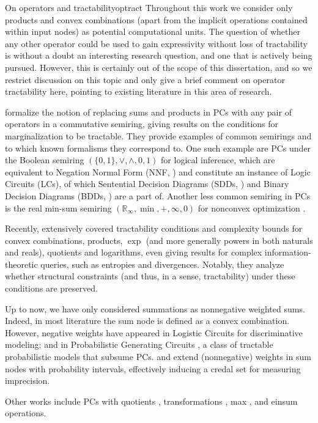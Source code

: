 \begin{remark}[breakable]{On operators and tractability}{optract}
  Throughout this work we consider only products and convex combinations (apart from the implicit
  operations contained within input nodes) as potential computational units. The question of whether
  any other operator could be used to gain expressivity without loss of tractability is without a
  doubt an interesting research question, and one that is actively being pursued. However, this is
  certainly out of the scope of this dissertation, and so we restrict discussion on this topic and
  only give a brief comment on operator tractability here, pointing to existing literature in this
  area of research.

  \citet{friesen16} formalize the notion of replacing sums and products in PCs with any pair of
  operators in a commutative semiring, giving results on the conditions for marginalization to be
  tractable. They provide examples of common semirings and to which known formalisms they
  correspond to. One such example are PCs under the Boolean semiring $(\{0,1\},\vee,\wedge,0,1)$
  for logical inference, which are equivalent to Negation Normal Form (NNF, \cite{barwise82}) and
  constitute an instance of Logic Circuits (LCs), of which Sentential Decision Diagrams (SDDs,
  \cite{darwiche11}) and Binary Decision Diagrams (BDDs, \cite{akers78}) are a part of. Another
  less common semiring in PCs is the real min-sum semiring $(\mathbb{R}_{\infty}, \min,+,\infty,0)$
  for nonconvex optimization \citep{friesen15}.

  Recently, \citet{vergari21} extensively covered tractability conditions and complexity bounds for
  convex combinations, products, $\exp$ (and more generally powers in both naturals and reals),
  quotients and logarithms, even giving results for complex information-theoretic queries, such as
  entropies and divergences. Notably, they analyze whether structural constraints (and thus, in a
  sense, tractability) under these conditions are preserved.

  Up to now, we have only considered summations as nonnegative weighted sums. Indeed, in most
  literature the sum node is defined as a convex combination. However, negative weights have
  appeared in Logistic Circuits \citep{liang19} for discriminative modeling; and in Probabilistic
  Generating Circuits \citep{zhang21}, a class of tractable probabilistic models that subsume PCs.
  \citet{maua17a} and \citet{mattei20b} extend (nonnegative) weights in sum nodes with probability
  intervals, effectively inducing a credal set \citep{cozman00} for measuring imprecision.

  Other works include PCs with quotients \citep{sharir18a}, transformations \citep{pevny20a}, max
  \citep{melibari16a}, and einsum \citep{peharz20b} operations.
\end{remark}

